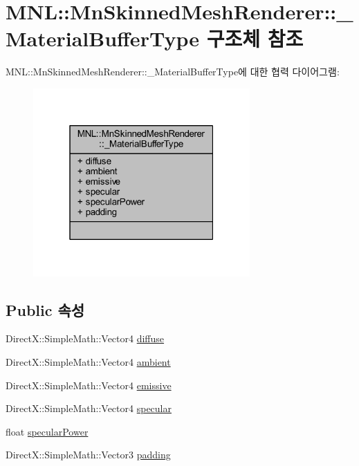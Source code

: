 \hypertarget{struct_m_n_l_1_1_mn_skinned_mesh_renderer_1_1___material_buffer_type}{}\section{M\+NL\+:\+:Mn\+Skinned\+Mesh\+Renderer\+:\+:\+\_\+\+Material\+Buffer\+Type 구조체 참조}
\label{struct_m_n_l_1_1_mn_skinned_mesh_renderer_1_1___material_buffer_type}


M\+NL\+:\+:Mn\+Skinned\+Mesh\+Renderer\+:\+:\+\_\+\+Material\+Buffer\+Type에 대한 협력 다이어그램\+:\nopagebreak
\begin{figure}[H]
\begin{center}
\leavevmode
\includegraphics[width=235pt]{struct_m_n_l_1_1_mn_skinned_mesh_renderer_1_1___material_buffer_type__coll__graph}
\end{center}
\end{figure}
\subsection*{Public 속성}
\begin{DoxyCompactItemize}
\item 
Direct\+X\+::\+Simple\+Math\+::\+Vector4 \hyperlink{struct_m_n_l_1_1_mn_skinned_mesh_renderer_1_1___material_buffer_type_a8914fb757cebc4cf514a3123791c87a8}{diffuse}
\item 
Direct\+X\+::\+Simple\+Math\+::\+Vector4 \hyperlink{struct_m_n_l_1_1_mn_skinned_mesh_renderer_1_1___material_buffer_type_a81ae4e3c1f9fed177e8ca033ba5fad2a}{ambient}
\item 
Direct\+X\+::\+Simple\+Math\+::\+Vector4 \hyperlink{struct_m_n_l_1_1_mn_skinned_mesh_renderer_1_1___material_buffer_type_a5efa524269d7a25ff9dc59152156c5b2}{emissive}
\item 
Direct\+X\+::\+Simple\+Math\+::\+Vector4 \hyperlink{struct_m_n_l_1_1_mn_skinned_mesh_renderer_1_1___material_buffer_type_ae4a229660dfd6408e16f0b80e147aefe}{specular}
\item 
float \hyperlink{struct_m_n_l_1_1_mn_skinned_mesh_renderer_1_1___material_buffer_type_adf39c878cd0b12017cd7b1bf3afbdfe2}{specular\+Power}
\item 
Direct\+X\+::\+Simple\+Math\+::\+Vector3 \hyperlink{struct_m_n_l_1_1_mn_skinned_mesh_renderer_1_1___material_buffer_type_a1a083f0554c6ae75fd5b049f98f3f27b}{padding}
\end{DoxyCompactItemize}


